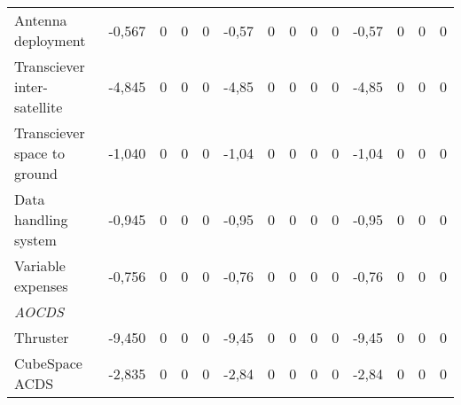 \begin{landscape}
\begin{table}[]
{\begin{tabular}{| l | l | l | l | l | l | l | l | l | l | l | l | l | l |}
Antenna deployment                                                                     & -0,567           & 0           & 0           & 0           & -0,57           & 0           & 0           & 0           & 0           & -0,57           & 0            & 0            & 0            \\
Transciever inter-satellite                                                            & -4,845           & 0           & 0           & 0           & -4,85           & 0           & 0           & 0           & 0           & -4,85           & 0            & 0            & 0            \\
Transciever space to ground                                                            & -1,040           & 0           & 0           & 0           & -1,04           & 0           & 0           & 0           & 0           & -1,04           & 0            & 0            & 0            \\
Data handling system                                                                   & -0,945           & 0           & 0           & 0           & -0,95           & 0           & 0           & 0           & 0           & -0,95           & 0            & 0            & 0            \\
Variable expenses                                                                      & -0,756           & 0           & 0           & 0           & -0,76           & 0           & 0           & 0           & 0           & -0,76           & 0            & 0            & 0            \\
\textit{AOCDS}                                                                         &                  &                 &                 &                 &                 &                 &                 &                 &                 &                 &                  &                  &                  \\
Thruster                                                                               & -9,450           & 0           & 0           & 0           & -9,45           & 0           & 0           & 0           & 0           & -9,45           & 0            & 0            & 0            \\
CubeSpace ACDS                                                                         & -2,835           & 0           & 0           & 0           & -2,84           & 0           & 0           & 0           & 0           & -2,84           & 0            & 0            & 0            \\

\end{tabular}}
\end{table}
\end{landscape}
